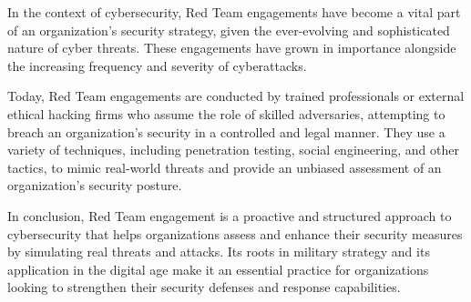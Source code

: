  In the context of cybersecurity, Red Team engagements have become a vital part of an organization's security strategy, given the ever-evolving and sophisticated nature of cyber threats. These engagements have grown in importance alongside the increasing frequency and severity of cyberattacks.


 Today, Red Team engagements are conducted by trained professionals or external ethical hacking firms who assume the role of skilled adversaries, attempting to breach an organization's security in a controlled and legal manner. They use a variety of techniques, including penetration testing, social engineering, and other tactics, to mimic real-world threats and provide an unbiased assessment of an organization's security posture.


In conclusion, Red Team engagement is a proactive and structured approach to cybersecurity that helps organizations assess and enhance their security measures by simulating real threats and attacks. Its roots in military strategy and its application in the digital age make it an essential practice for organizations looking to strengthen their security defenses and response capabilities.
